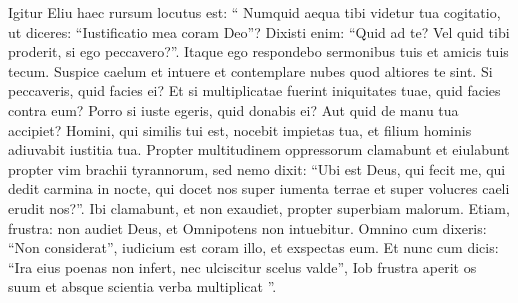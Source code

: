 \begin{biblechapter}
\begin{biblechapter}
\begin{biblechapter}
\begin{biblechapter}
\begin{biblechapter}
\begin{biblechapter}
\begin{biblechapter}
\begin{biblechapter}
\begin{biblechapter}
\begin{biblechapter}
\begin{biblechapter}
\begin{biblechapter}
\begin{biblechapter}
\begin{biblechapter}
\begin{biblechapter}
\begin{biblechapter}
\begin{biblechapter}
\begin{biblechapter}
\begin{biblechapter}
\begin{biblechapter}
\begin{biblechapter}
\begin{biblechapter}
\begin{biblechapter}
\begin{biblechapter}
\begin{biblechapter}
\begin{biblechapter}
\begin{biblechapter}
\begin{biblechapter}
\begin{biblechapter}
\begin{biblechapter}
\begin{biblechapter}
\begin{biblechapter}
\begin{biblechapter}
\begin{biblechapter}
\begin{biblechapter}
\verse Igitur Eliu haec rursum locutus est:
 \verse “ Numquid aequa tibi videtur tua cogitatio,
 ut diceres: “Iustificatio mea coram Deo”?
 \verse Dixisti enim: “Quid ad te?
 Vel quid tibi proderit, si ego peccavero?”.
 \verse Itaque ego respondebo sermonibus tuis
 et amicis tuis tecum.
 \verse Suspice caelum et intuere
 et contemplare nubes quod altiores te sint.
 \verse Si peccaveris, quid facies ei?
 Et si multiplicatae fuerint iniquitates tuae, quid facies contra eum?
 \verse Porro si iuste egeris, quid donabis ei?
 Aut quid de manu tua accipiet?
 \verse Homini, qui similis tui est, nocebit impietas tua,
 et filium hominis adiuvabit iustitia tua.
 \verse Propter multitudinem oppressorum clamabunt
 et eiulabunt propter vim brachii tyrannorum,
 \verse sed nemo dixit: “Ubi est Deus, qui fecit me,
 qui dedit carmina in nocte,
 \verse qui docet nos super iumenta terrae
 et super volucres caeli erudit nos?”.
 \verse Ibi clamabunt, et non exaudiet,
 propter superbiam malorum.
 \verse Etiam, frustra: non audiet Deus,
 et Omnipotens non intuebitur.
 \verse Omnino cum dixeris: “Non considerat”,
 iudicium est coram illo, et exspectas eum.
 \verse Et nunc cum dicis: “Ira eius poenas non infert,
 nec ulciscitur scelus valde”,
 \verse Iob frustra aperit os suum
 et absque scientia verba multiplicat ”.
 

\end{biblechapter}
\end{biblechapter}
\end{biblechapter}
\end{biblechapter}
\end{biblechapter}
\end{biblechapter}
\end{biblechapter}
\end{biblechapter}
\end{biblechapter}
\end{biblechapter}
\end{biblechapter}
\end{biblechapter}
\end{biblechapter}
\end{biblechapter}
\end{biblechapter}
\end{biblechapter}
\end{biblechapter}
\end{biblechapter}
\end{biblechapter}
\end{biblechapter}
\end{biblechapter}
\end{biblechapter}
\end{biblechapter}
\end{biblechapter}
\end{biblechapter}
\end{biblechapter}
\end{biblechapter}
\end{biblechapter}
\end{biblechapter}
\end{biblechapter}
\end{biblechapter}
\end{biblechapter}
\end{biblechapter}
\end{biblechapter}
\end{biblechapter}
